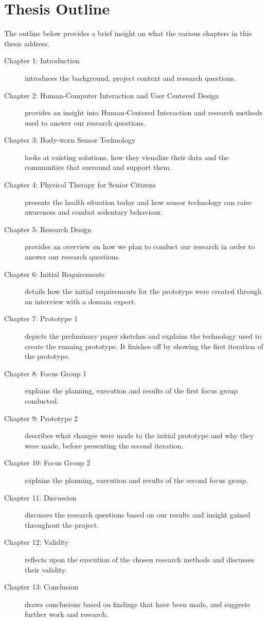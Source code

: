 \section{Thesis Outline}
The outline below provides a brief insight on what the various chapters in this thesis address.

\begin{description}
  \item[Chapter 1: Introduction] introduces the background, project context and research questions.
  \item[Chapter 2: Human-Computer Interaction and User Centered Design] provides an insight into Human-Centered Interaction and research methods used to answer our research questions.
  \item[Chapter 3: Body-worn Sensor Technology] looks at existing solutions, how they visualize their data and the communities that surround and support them.
  \item[Chapter 4: Physical Therapy for Senior Citizens] presents the health situation today and how sensor technology can raise awareness and combat sedentary behaviour.
  \item[Chapter 5: Research Design] provides an overview on how we plan to conduct our research in order to answer our research questions.
  \item[Chapter 6: Initial Requirements] details how the initial requirements for the prototype were created through an interview with a domain expert.
  \item[Chapter 7: Prototype 1] depicts the preliminary paper sketches and explains the technology used to create the running prototype. It finishes off by showing the first iteration of the prototype.
  \item[Chapter 8: Focus Group 1] explains the planning, execution and results of the first focus group conducted.
  \item[Chapter 9: Prototype 2] describes what changes were made to the initial prototype and why they were made, before presenting the second iteration.
  \item[Chapter 10: Focus Group 2] explains the planning, execution and results of the second focus group.
  \item[Chapter 11: Discussion] discusses the research questions based on our results and insight gained throughout the project.
  \item[Chapter 12: Validity] reflects upon the execution of the chosen research methods and discusses their validity.
  \item[Chapter 13: Conclusion] draws conclusions based on findings that have been made, and suggests further work and research.
\end{description}
